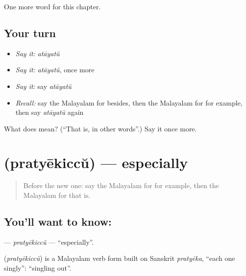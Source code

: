 \begin{grammarlens}[title={What you've built}]
One more word for this chapter.
\end{grammarlens}

\subsection*{Your turn}
\begin{itemize}
\raggedright
  \item \emph{Say it:} \emph{atāyatŭ}
  \item \emph{Say it:} \emph{atāyatŭ}, once more
  \item \emph{Say it:} say \emph{atāyatŭ}
  \item \emph{Recall:} say the Malayalam for besides, then the Malayalam for for example, then say \emph{atāyatŭ} again
\end{itemize}

\begin{tcolorbox}[breakable,colback=teal!4,colframe=teal!35!black,title={Before you move on}]
What does  mean? (\textquotedblleft{}That is, in other words\textquotedblright{}.) Say it once more.
\end{tcolorbox}
\section[\texorpdfstring{\ml{പ്രത്യേകിച്ച്} (pratyēkiccŭ)}{പ്രത്യേകിച്ച് (pratyēkiccŭ)}]{ (pratyēkiccŭ) — especially}

\label{lesson:ML-C281-pratyekiccu}



\begin{quote}
Before the new one: say the Malayalam for for example, then the Malayalam for that is.
\end{quote}

\subsection*{You'll want to know: }
\textbf{} — \emph{pratyēkiccŭ} — \textquotedblleft{}especially\textquotedblright{}.

\begin{cousinweb}
\textbf{} (\emph{pratyēkiccŭ}) is a Malayalam verb form built on Sanskrit \emph{pratyēka}, \textquotedblleft{}each one singly\textquotedblright{}: \textquotedblleft{}singling out\textquotedblright{}.
\end{cousinweb}


